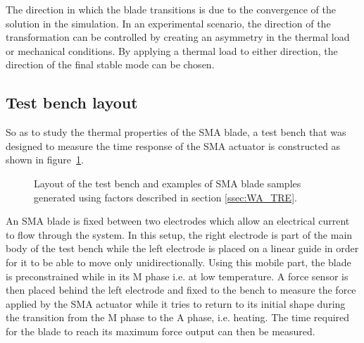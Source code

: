 The direction in which the blade transitions is due to the convergence of the solution in the simulation. In an experimental scenario, the direction of the transformation can be controlled by creating an asymmetry in the thermal load or mechanical conditions. By applying a thermal load to either direction, the direction of the final stable mode can be chosen.

\subsection{Test bench layout}
So as to study the thermal properties of the SMA blade, a test bench that was designed to measure the time response of the SMA actuator is constructed as shown in figure~\ref{fig:test_bench}.
\newpage
%     
\begin{figure}
	\vspace{10pt}
	\centering
  {\footnotesize
  	\def\svgwidth{0.5\columnwidth}
  	
  }
	\caption{Layout of the test bench and examples of SMA blade samples generated using factors described in section \ref{ssec:WA_TRE}.}
	\vspace{-5pt}
	\label{fig:test_bench}
\end{figure}

An SMA blade is fixed between two electrodes which allow an electrical current to flow through the system. In this setup, the right electrode is part of the main body of the test bench while the left electrode is placed on a linear guide in order for it to be able to move only unidirectionally. Using this mobile part, the blade is preconstrained while in its M phase i.e. at low temperature. A force sensor is then placed behind the left electrode and fixed to the bench to measure the force applied by the SMA actuator while it tries to return to its initial shape during the transition from the M phase to the A phase, i.e. heating. The time required for the blade to reach its maximum force output can then be measured.

